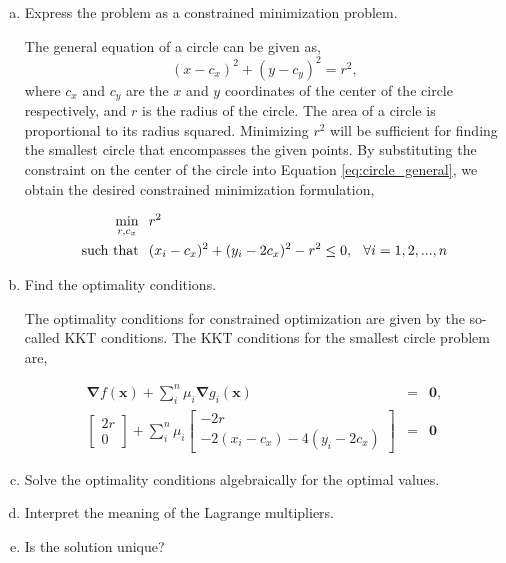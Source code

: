 \documentclass{article}
\newcommand{\exspace}{\hspace{0.1in}}
\begin{document}
\begin{enumerate}[a)]

\item Express the problem as a constrained minimization problem.

The general equation of a circle can be given as,
\begin{equation} \label{eq:circle_general}
(x - c_x)^2 + (y - c_y)^2 = r^2,
\end{equation}
where $c_x$ and $c_y$ are the $x$ and $y$ coordinates of the center of the circle respectively, and $r$ is the radius of the circle.
The area of a circle is proportional to its radius squared.
Minimizing $r^2$ will be sufficient for finding the smallest circle that encompasses the given points.
By substituting the constraint on the center of the circle into Equation \ref{eq:circle_general}, we obtain the desired constrained minimization formulation,

\begin{align*}
\min_{r, c_x} \exspace & r^2 \\
\text{such that} \exspace & (x_i - c_x)^2 + (y_i - 2c_x)^2 - r^2 \le 0, \exspace \forall i = 1, 2, ..., n
\end{align*}

\item Find the optimality conditions.

The optimality conditions for constrained optimization are given by the so-called KKT conditions.
The KKT conditions for the smallest circle problem are,

\begin{eqnarray*}
\mathbf{\nabla} f(\mathbf{x}) + \sum_{i}^{n} \mu_i \mathbf{\nabla} g_i(\mathbf{x}) &=& \mathbf{0}, \\
\begin{bmatrix}2r \\ 0\end{bmatrix} + \sum_{i}^{n} \mu_i \begin{bmatrix}-2r \\ -2(x_i - c_x) - 4(y_i - 2c_x)\end{bmatrix} &=& \mathbf{0}
\end{eqnarray*}

\item Solve the optimality conditions algebraically for the optimal values.



\item Interpret the meaning of the Lagrange multipliers.



\item Is the solution unique?

\end{enumerate}
\end{document}
